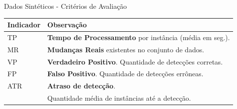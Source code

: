 \documentclass[10pt]{beamer}
\begin{document}
\begin{frame}{Dados Sintéticos - Critérios de Avaliação}
    \begin{table}[h]
        \centering
        \begin{tabularx}{\textwidth}{ll}
        \toprule
        Indicador & Observação \\
        \midrule
        TP       &  \textbf{Tempo de Processamento} por instância (média em seg.). \\
        MR       &  \textbf{Mudanças Reais} existentes no conjunto de dados. \\
        VP       &  \textbf{Verdadeiro Positivo}. Quantidade de detecções corretas. \\
        FP       &  \textbf{Falso Positivo}. Quantidade de detecções errôneas. \\
        ATR      &  \textbf{Atraso de detecção}. \\
                 &  Quantidade média de instâncias até a detecção. \\
        \bottomrule
        \end{tabularx}
    \end{table}
\end{frame}
\end{document}
